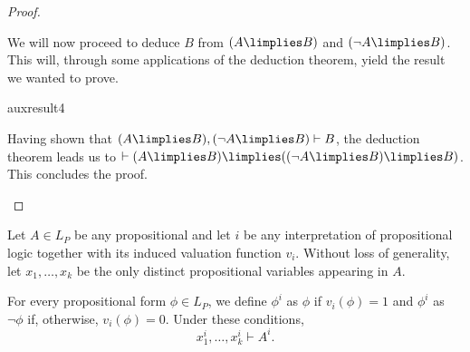 \begin{proof}
\begin{parlist}
We will now proceed to deduce $B$ from $(A\limplies B)$ and $(\lnot A \limplies B)$. This will, through some applications of the deduction theorem, yield the result we wanted to prove.
\begin{deduction}{auxresult4}
\end{deduction}
Having shown that $(A \limplies B), (\lnot A \limplies B) \vdash B$, the deduction theorem leads us to $\vdash (A\limplies B) \limplies ( (\lnot A \limplies B) \limplies B)$. This concludes the proof.
\end{parlist}
\end{proof}

\begin{lemma}
Let $A\in L_P$ be any propositional and let $i$ be any interpretation of propositional logic together with its induced valuation function $v_i$.
Without loss of generality, let $x_1,\ldots,x_k$ be the only distinct propositional variables appearing in $A$.

For every propositional form $\phi \in L_{P}$, we define $\phi^i$ as $\phi$ if $v_i(\phi) = 1$ and $\phi^i$ as $\lnot \phi$ if, otherwise, $v_i(\phi) = 0$.
Under these conditions,
\[ x_1^i,\ldots,x_k^i \vdash A^i.\]
\label{<+label+>}
\end{lemma}

